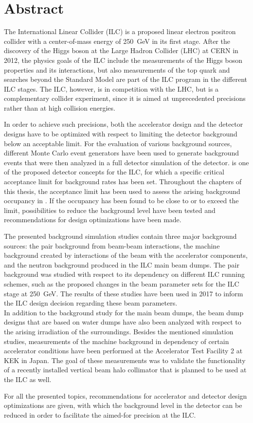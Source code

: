 \chapter*{Abstract}
The International Linear Collider (ILC) is a proposed linear electron positron collider with a center-of-mass energy of \SI{250}{\GeV} in its first stage.
After the discovery of the Higgs boson at the Large Hadron Collider (LHC) at CERN in 2012, the physics goals of the ILC include the measurements of the Higgs boson properties and its interactions, but also measurements of the top quark and searches beyond the Standard Model are part of the ILC program in the different ILC stages.
The ILC, however, is in competition with the LHC, but is a complementary collider experiment, since it is aimed at unprecedented precisions rather than at high collision energies.

In order to achieve such precisions, both the accelerator design and the detector designs have to be optimized with respect to limiting the detector background below an acceptable limit.
For the evaluation of various background sources, different Monte Carlo event generators have been used to generate background events that were then analyzed in a full detector simulation of the \sid detector.
\sid is one of the proposed detector concepts for the ILC, for which a specific critical acceptance limit for background rates has been set.
Throughout the chapters of this thesis, the acceptance limit has been used to assess the arising background occupancy in \sid.
If the occupancy has been found to be close to or to exceed the limit, possibilities to reduce the background level have been tested and recommendations for design optimizations have been made.

The presented background simulation studies contain three major background sources: the \positron\electron pair background from beam-beam interactions, the machine background created by interactions of the beam with the accelerator components, and the neutron background produced in the ILC main beam dumps.
The pair background was studied with respect to its dependency on different ILC running schemes, such as the proposed changes in the beam parameter sets for the ILC stage at \SI{250}{\GeV}.
The results of these studies have been used in 2017 to inform the ILC design decision regarding these beam parameters.
\\In addition to the background study for the main beam dumps, the beam dump designs that are based on water dumps have also been analyzed with respect to the arising irradiation of the surroundings.
Besides the mentioned simulation studies, measurements of the machine background in dependency of certain accelerator conditions have been performed at the Accelerator Test Facility 2 at KEK in Japan.
The goal of these measurements was to validate the functionality of a recently installed vertical beam halo collimator that is planned to be used at the ILC as well.

For all the presented topics, recommendations for accelerator and detector design optimizations are given, with which the background level in the \sid detector can be reduced in order to facilitate the aimed-for precision at the ILC.